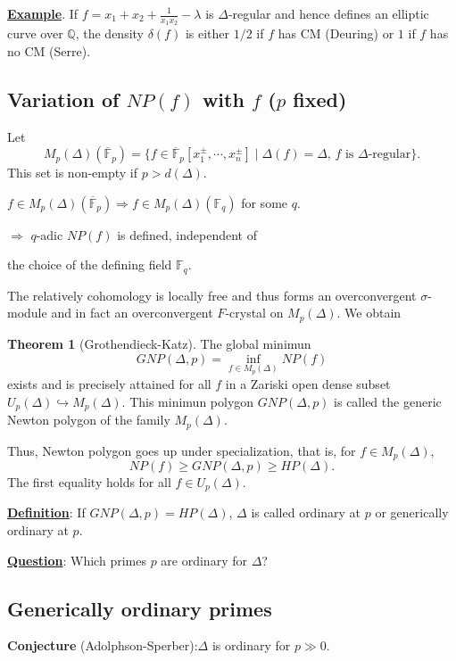 \documentclass[a4paper,oneside,11pt]{article}
\theoremstyle{plain} \theoremstyle{definition}
\newtheorem{Thm}{Theorem}[section]
\theoremstyle{remark}
\newcommand{\Q}{\mathbb{Q}}
\newcommand{\f}{\mathbb{F}}
\begin{document}
\underline{\bf Example}. If $f=x_1+x_2+\frac{1}{x_1x_2}-\lambda$ is $\Delta$-regular
and hence defines an elliptic curve over $\Q$, the density $\delta(f)$ is
either $1/2$ if $f$ has CM (Deuring) or $1$ if $f$ has no CM (Serre).




 \subsection{Variation of $NP(f)$ with $f$ ($p$ fixed)}

 Let $$M_p(\Delta)(\overline{\f}_p)=\{f\in
 \overline{\f}_p[x_1^{\pm},\cdots,x_n^{\pm}]
 \mid \Delta(f)=\Delta,\, f \text{ is $\Delta$-regular}\}.$$
This set is non-empty if $p>d(\Delta)$.

 $f\in
 M_p(\Delta)(\overline{\f}_p)\Rightarrow f\in M_p(\Delta)(\f_q)$ for some $q$.

 \hskip 2.7cm $\Rightarrow$ $q$-adic $NP(f)$ is defined, independent of

 \hskip 2.7cm the choice of the defining field $\f_q$.

The relatively cohomology is locally free and thus forms an overconvergent 
$\sigma$-module and in fact an overconvergent $F$-crystal on $M_p(\Delta)$. 
We obtain

 \begin{Thm}[Grothendieck-Katz]
The global minimun
$$GNP(\Delta, p)=\inf_{f\in M_p(\Delta)}NP(f)$$
exists and is precisely attained for all $f$
in a Zariski open dense subset $U_p(\Delta)\hookrightarrow M_p(\Delta)$.
This minimun polygon
$GNP(\Delta,p)$ is called the generic Newton polygon of the family $M_p(\Delta)$.
\end{Thm}

Thus, Newton polygon goes up under specialization, that is, for $f\in M_p(\Delta)$, 
$$NP(f)\ge GNP(\Delta, p)\ge HP(\Delta).$$
The first equality holds for all $f\in U_p(\Delta)$.


\underline{\bf Definition}: \quad If $GNP(\Delta,p)=HP(\Delta)$, $\Delta$ is called ordinary at $p$ or
 generically ordinary at $p$.

\underline{\bf Question}: Which primes $p$ are ordinary for $\Delta$?


\subsection{Generically ordinary primes}

{\bf Conjecture} (Adolphson-Sperber):\quad $\Delta$ is ordinary for $p\gg0$.
\end{document}
